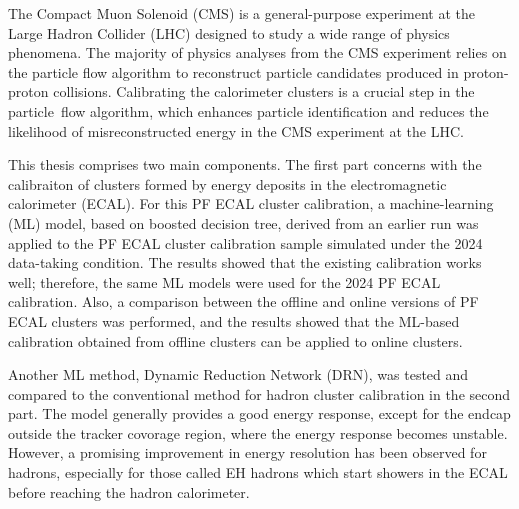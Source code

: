 
The Compact Muon Solenoid (CMS) is a general-purpose experiment at the Large Hadron Collider (LHC) designed to study a wide range of physics phenomena.
The majority of physics analyses from the CMS experiment relies on the particle flow algorithm to reconstruct particle candidates produced in proton-proton collisions.
%
Calibrating the calorimeter clusters is a crucial step in the particle flow algorithm, which enhances particle identification and reduces the likelihood of misreconstructed energy in the CMS experiment at the LHC.

This thesis comprises two main components.
The first part concerns with the calibraiton of clusters formed by energy deposits in the electromagnetic calorimeter (ECAL).
For this PF ECAL cluster calibration,
a machine-learning (ML) model, based on boosted decision tree, derived from an earlier run was applied to the PF ECAL cluster calibration sample simulated under the 2024 data-taking condition.
The results showed that the existing calibration works well; therefore, the same ML models were used for the 2024 PF ECAL calibration.
Also, a comparison between the offline and online versions of PF ECAL clusters was performed, and the results showed that the ML-based calibration obtained from offline clusters can be applied to online clusters.

Another ML method, Dynamic Reduction Network (DRN), was tested and compared to the conventional method for hadron cluster calibration in the second part.
The model generally provides a good energy response, except for the endcap outside the tracker covorage region, where the energy response becomes unstable.
However, a promising improvement in energy resolution has been observed for hadrons, especially for those called EH hadrons which start showers in the ECAL before reaching the hadron calorimeter.




